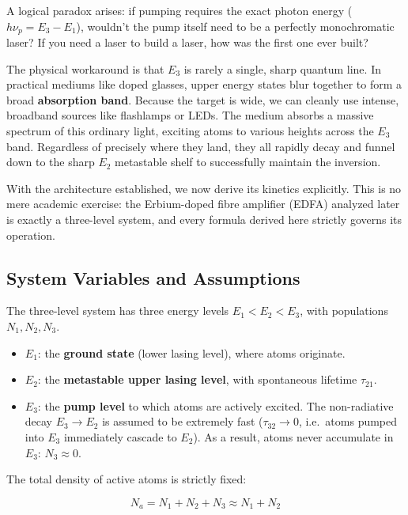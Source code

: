 \begin{keyinsight}
    A logical paradox arises: if pumping requires the exact photon energy ($h\nu_p = E_3 - E_1$), wouldn't the pump itself need to be a perfectly monochromatic laser? If you need a laser to build a laser, how was the first one ever built?

    The physical workaround is that $E_3$ is rarely a single, sharp quantum line. In practical mediums like doped glasses, upper energy states blur together to form a broad \textbf{absorption band}. Because the target is wide, we can cleanly use intense, broadband sources like flashlamps or LEDs. The medium absorbs a massive spectrum of this ordinary light, exciting atoms to various heights across the $E_3$ band. Regardless of precisely where they land, they all rapidly decay and funnel down to the sharp $E_2$ metastable shelf to successfully maintain the inversion.
\end{keyinsight}

With the architecture established, we now derive its kinetics explicitly. This is no mere academic exercise: the Erbium-doped fibre amplifier (EDFA) analyzed later is exactly a three-level system, and every formula derived here strictly governs its operation.

\subsection{System Variables and Assumptions}

The three-level system has three energy levels $E_1 < E_2 < E_3$, with populations $N_1, N_2, N_3$.
\begin{itemize}
    \item $E_1$: the \textbf{ground state} (lower lasing level), where atoms originate.
    \item $E_2$: the \textbf{metastable upper lasing level}, with spontaneous lifetime $\tau_{21}$.
    \item $E_3$: the \textbf{pump level} to which atoms are actively excited. The non-radiative decay $E_3 \to E_2$ is assumed to be extremely fast ($\tau_{32} \to 0$, i.e.\ atoms pumped into $E_3$ immediately cascade to $E_2$). As a result, atoms never accumulate in $E_3$: $N_3 \approx 0$.
\end{itemize}

The total density of active atoms is strictly fixed:
\begin{keyresult}
    \begin{equation}
        N_a = N_1 + N_2 + N_3 \approx N_1 + N_2
    \end{equation}
\end{keyresult}

